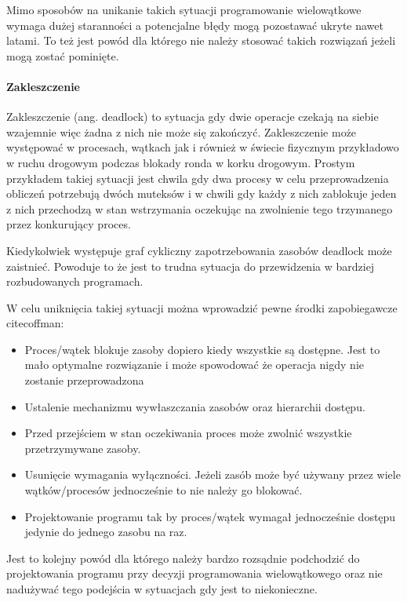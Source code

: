 Mimo sposobów na unikanie takich sytuacji programowanie wielowątkowe wymaga dużej staranności a potencjalne błędy mogą pozostawać ukryte nawet latami. To też jest powód dla którego nie należy stosować takich rozwiązań jeżeli mogą zostać pominięte\cite{multi thread problem}.
\paragraph{Zakleszczenie}

Zakleszczenie (ang. deadlock) to sytuacja gdy dwie operacje czekają na siebie wzajemnie więc żadna z nich nie może się zakończyć. 
Zakleszczenie może występować w procesach, wątkach jak i również w świecie fizycznym przykładowo w ruchu drogowym podczas blokady ronda w korku drogowym.  
Prostym przykładem takiej sytuacji jest chwila gdy dwa procesy w celu przeprowadzenia obliczeń potrzebują dwóch muteksów i w chwili gdy każdy z nich zablokuje jeden z nich przechodzą w stan wstrzymania oczekując na zwolnienie tego trzymanego przez konkurujący proces. 

 Kiedykolwiek występuje graf cykliczny zapotrzebowania zasobów deadlock może zaistnieć. 
 Powoduje to że jest to trudna sytuacja do przewidzenia w bardziej rozbudowanych programach.

W celu uniknięcia takiej sytuacji można wprowadzić pewne środki zapobiegawcze\\cite{coffman}:
\begin{itemize}
        \item Proces/wątek blokuje zasoby dopiero kiedy wszystkie są dostępne. Jest to mało optymalne rozwiązanie i może spowodować że operacja nigdy nie zostanie przeprowadzona
        \item Ustalenie mechanizmu wywłaszczania zasobów oraz hierarchii dostępu. 
        \item Przed przejściem w stan oczekiwania proces może zwolnić wszystkie przetrzymywane zasoby. 
        \item Usunięcie wymagania wyłączności. Jeżeli zasób może być używany przez wiele wątków/procesów jednocześnie to nie należy go blokować.  
        \item Projektowanie programu tak by proces/wątek wymagał jednocześnie dostępu jedynie do jednego zasobu na raz. 
\end{itemize} 

Jest to kolejny powód dla którego należy bardzo rozsądnie podchodzić do projektowania programu przy decyzji programowania wielowątkowego oraz nie nadużywać tego podejścia w sytuacjach gdy jest to niekonieczne. 

